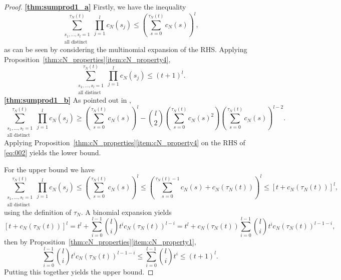 \begin{proof} \textbf{\ref{thm:sumprod1_a}}
Firstly, we have the inequality
\begin{equation*}
\sum_{\substack{ s_1, \dots, s_l =1 \\ \text{all distinct} }}^{\tau_N(t)}
        \prod_{j=1}^l c_N(s_j)
\leq \left( \sum_{s=0}^{\tau_N(t)} c_N(s) \right)^l ,
\end{equation*}
as can be seen by considering the multinomial expansion of the RHS.
Applying Proposition~\ref{thm:cN_properties}\ref{item:cN_property4},
\begin{equation*}%
\sum_{\substack{ s_1, \dots, s_l =1 \\ \text{all distinct} }}^{\tau_N(t)}
        \prod_{j=1}^l c_N(s_j)
\leq (t+1)^l .
\end{equation*}
\textbf{\ref{thm:sumprod1_b}}
As pointed out in \textcite[Equation (8)]{koskela2018}, 
\begin{equation}\label{eq:002}
\sum_{\substack{ s_1, \dots, s_l =1 \\ \text{all distinct} }}^{\tau_N(t)} 
        \prod_{j=1}^l c_N(s_j)
\geq \left( \sum_{s=0}^{\tau_N(t)} c_N(s) \right)^l
        - \binom{l}{2} \left( \sum_{s=0}^{\tau_N(t)} c_N(s)^2 \right)
        \left( \sum_{s=0}^{\tau_N(t)} c_N(s) \right)^{l-2} .
\end{equation}
Applying Proposition~\ref{thm:cN_properties}\ref{item:cN_property4} on the RHS of \eqref{eq:002} yields the lower bound.

For the upper bound we have
\begin{equation*}
\sum_{\substack{ s_1, \dots, s_l =1 \\ \text{all distinct} }}^{\tau_N(t)} 
        \prod_{j=1}^l c_N(s_j)
\leq \left( \sum_{s=0}^{\tau_N(t)} c_N(s) \right)^l
\leq \left( \sum_{s=0}^{\tau_N(t) -1} c_N(s) + c_N(\tau_N(t)) \right)^l
\leq \left[ t + c_N(\tau_N(t)) \right]^l ,
\end{equation*}
using the definition of $\tau_N$.
A binomial expansion yields
\begin{equation*}
\left[ t + c_N(\tau_N(t)) \right]^l
= t^l + \sum_{i=0}^{l-1} \binom{l}{i} t^i c_N(\tau_N(t))^{l-i}
= t^l + c_N(\tau_N(t)) \sum_{i=0}^{l-1} \binom{l}{i} t^i c_N(\tau_N(t))^{l-1-i} ,
\end{equation*}
then by Proposition~\ref{thm:cN_properties}\ref{item:cN_property1},
\begin{equation*}
\sum_{i=0}^{l-1} \binom{l}{i} t^i c_N(\tau_N(t))^{l-1-i}
\leq \sum_{i=0}^{l-1} \binom{l}{i} t^i
\leq (t+1)^l .
\end{equation*}
Putting this together yields the upper bound.
\end{proof}


